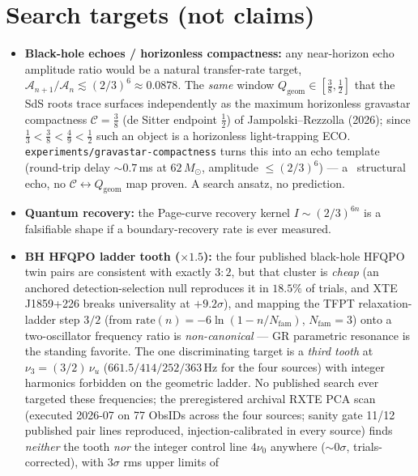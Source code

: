 \section{Search targets (not claims)}
\begin{gapbox}
\begin{itemize}\setlength\itemsep{2pt}
\item \textbf{Black-hole echoes / horizonless compactness:} any near-horizon echo amplitude ratio would be
a natural transfer-rate target, $\mathcal A_{n+1}/\mathcal A_n\lesssim(2/3)^6\approx0.0878$. The \emph{same}
window $Q_{\mathrm{geom}}\in[\tfrac38,\tfrac12]$ that the SdS roots trace surfaces independently as the
maximum horizonless gravastar compactness $\mathcal C=\tfrac38$ (de Sitter endpoint $\tfrac12$) of
Jampolski--Rezzolla (2026); since $\tfrac13<\tfrac38<\tfrac49<\tfrac12$ such an object is a horizonless
light-trapping ECO. \texttt{experiments/gravastar-compactness} turns this into an echo template (round-trip
delay $\sim0.7$\,ms at $62\,M_\odot$, amplitude $\le(2/3)^6$) --- a \mC\ structural echo, no
$\mathcal C\!\leftrightarrow\!Q_{\mathrm{geom}}$ map proven. A search ansatz, no prediction.
\item \textbf{Quantum recovery:} the Page-curve recovery kernel $I\sim(2/3)^{6n}$ is a falsifiable shape
if a boundary-recovery rate is ever measured.
\item \textbf{BH HFQPO ladder tooth ($\times1.5$):} the four published black-hole HFQPO twin pairs are
consistent with exactly $3{:}2$, but that cluster is \emph{cheap} (an anchored detection-selection null
reproduces it in $18.5\%$ of trials, and XTE J1859+226 breaks universality at $+9.2\sigma$), and mapping the
TFPT relaxation-ladder step $3/2$ (from $\mathrm{rate}(n)=-6\ln(1-n/N_{\mathrm{fam}})$, $N_{\mathrm{fam}}=3$)
onto a two-oscillator frequency ratio is \emph{non-canonical} --- GR parametric resonance is the standing
favorite. The one discriminating target is a \emph{third tooth} at $\nu_3=(3/2)\,\nu_u$
($661.5/414/252/363$\,Hz for the four sources) with integer harmonics forbidden on the geometric ladder.
No published search ever targeted these frequencies; the preregistered archival RXTE PCA scan (executed
2026-07 on 77 ObsIDs across the four sources; sanity gate 11/12 published pair lines reproduced,
injection-calibrated in every source) finds \emph{neither} the tooth \emph{nor} the integer control line
$4\nu_0$ anywhere ($\sim\!0\sigma$, trials-corrected), with $3\sigma$ rms upper limits of

\end{itemize}
\end{gapbox}
